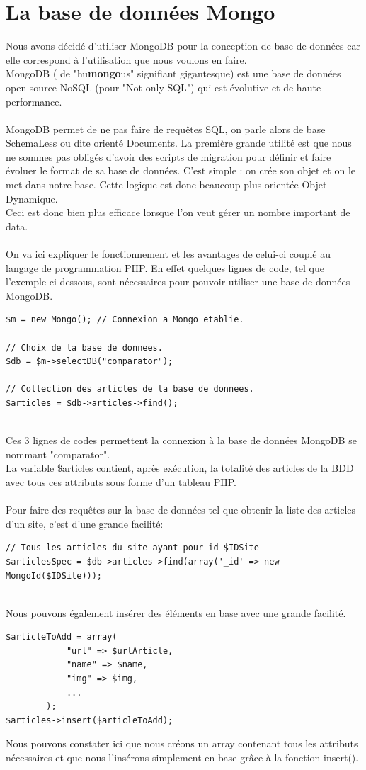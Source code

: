 \documentclass{report}
\begin{document}
\section{La base de données Mongo}
Nous avons décidé d'utiliser MongoDB pour la conception de base de données car elle correspond à l'utilisation que nous voulons en faire.\\
MongoDB ( de "hu\textbf{mongo}us" signifiant gigantesque) est une base de données open-source NoSQL (pour "Not only SQL") qui est évolutive et de haute performance.\\\\
MongoDB permet de ne pas faire de requêtes SQL, on parle alors de base SchemaLess ou dite orienté Documents.
La première grande utilité est que nous ne sommes pas obligés d'avoir des scripts de migration pour définir et faire évoluer le format de sa base de données. C'est simple : on crée son objet et on le met dans notre base. Cette logique est donc beaucoup plus orientée Objet Dynamique.\\
Ceci est donc bien plus efficace lorsque l'on veut gérer un nombre important de data.\\\\
On va ici expliquer le fonctionnement et les avantages de celui-ci couplé au langage de programmation PHP.
En effet quelques lignes de code, tel que l'exemple ci-dessous, sont nécessaires pour pouvoir utiliser une base de données MongoDB.
\begin{lstlisting}
$m = new Mongo(); // Connexion a Mongo etablie.

// Choix de la base de donnees.
$db = $m->selectDB("comparator");

// Collection des articles de la base de donnees.
$articles = $db->articles->find();
\end{lstlisting}
~\\
Ces 3 lignes de codes permettent la connexion à la base de données MongoDB se nommant "comparator".\\
La variable \$articles contient, après exécution, la totalité des articles de la BDD avec tous ces attributs sous forme d'un tableau PHP.\\\\
Pour faire des requêtes sur la base de données tel que obtenir la liste des articles d'un site, c'est d'une grande facilité:
\begin{lstlisting}
// Tous les articles du site ayant pour id $IDSite
$articlesSpec = $db->articles->find(array('_id' => new MongoId($IDSite)));
\end{lstlisting}
~\\
Nous pouvons également insérer des éléments en base avec une grande facilité.
\begin{lstlisting}
$articleToAdd = array(
			"url" => $urlArticle,
			"name" => $name,
			"img" => $img, 
			...
		);
$articles->insert($articleToAdd);
\end{lstlisting}
Nous pouvons constater ici que nous créons un array contenant tous les attributs nécessaires et que nous l'insérons simplement en base grâce à la fonction insert().
\end{document}
